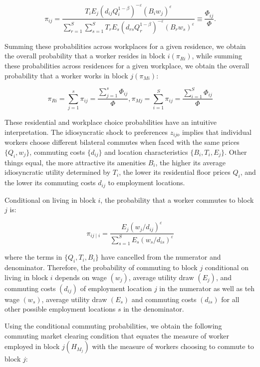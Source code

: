 \begin{equation}
    \pi_{ij} = \frac{T_i E_j(d_{ij} Q_i^{1 - \beta})^{-\varepsilon} (B_i w_j)^{\varepsilon}}{\sum_{r=1}^S \sum_{s=1}^S T_r E_s(d_{rs}Q_r^{1 - \beta})^{-\varepsilon} (B_r w_s)^{\varepsilon}} \equiv \frac{\Phi_{ij}}{\Phi}.
\end{equation}

Summing these probabilities across workplaces for a given residence, we obtain the overall probability that a worker resides in block $i(\pi_{Ri})$, while summing these probabilities across residences for a given workplace, we obtain the overall probability that a worker works in block $j(\pi_{Mi})$:

\begin{equation}
    \pi_{Ri} = \sum_{j=1}^s \pi_{ij} = \frac{\sum_{j=1}^s \Phi_{ij}}{\Phi}, \pi_{Mj} = \sum_{i=1}^S \pi_{ij} = \frac{\sum_{i=1}^S \Phi_{ij}}{\Phi}
\end{equation}

These residential and workplace choice probabilities have an intuitive interpretation. The idiosyncratic shock to preferences $z_{ijo}$ implies that individual workers choose different bilateral commutes when faced with the same prices $\{Q_i, w_j\}$, commuting costs $\{d_{ij}\}$ and location characteristics $\{B_i, T_i, E_j\}$. Other things equal, the more attractive its amenities $B_i$, the higher its average idiosyncratic utility determined by $T_i$, the lower its residential floor prices $Q_i$, and the lower its commuting costs $d_{ij}$ to employment locations.

Conditional on living in block $i$, the probability that a worker commutes to block $j$ is:

\begin{equation}
  \pi_{ij \mid i} = \frac{E_j(w_j / d_{ij})^\varepsilon}{\sum_{s=1}^S E_s(w_s / d_{is})^\varepsilon}
\end{equation}

where the terms in $\{Q_i, T_i, B_i\}$ have cancelled from the numerator and denominator. Therefore, the probability of commuting to block $j$ conditional on living in block $i$ depends on wage $(w_j)$, average utility draw $(E_j)$, and commuting costs $(d_{ij})$ of employment location $j$ in the numerator as well as teh wage $(w_s)$, average utility draw $(E_s)$ and commuting costs $(d_{is})$ for all other possible employment locations $s$ in the denominator.

Using the conditional commuting probabilities, we obtain the following commuting market clearing condition that equates the measure of worker employed in block $j (H_{M_j})$ with the measure of workers choosing to commute to block $j$:


